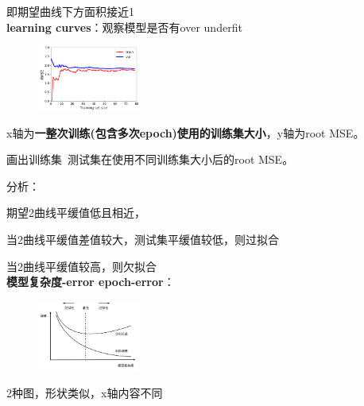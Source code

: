 \documentclass[UTF8]{ctexart}
\begin{document}
  \quad 即期望曲线下方面积接近1\\
\textbf{learning curves}：观察模型是否有over underfit

  \begin{figure}[H] %
    \centering %
    \includegraphics[width=0.3\textwidth]{note_images/learning_curve.png} %
  \end{figure}

  x轴为\textbf{一整次训练(包含多次epoch)使用的训练集大小}，y轴为root MSE。

  画出训练集\ 测试集在使用不同训练集大小后的root MSE。

  分析：

  \quad 期望2曲线平缓值低且相近，

  \quad 当2曲线平缓值差值较大，测试集平缓值较低，则过拟合

  \quad 当2曲线平缓值较高，则欠拟合\\
\textbf{模型复杂度-error epoch-error}：

  \begin{figure}[H] %
    \centering %
    \includegraphics[width=0.3\textwidth]{note_images/epoch-complex-error.png} %
  \end{figure}

  2种图，形状类似，x轴内容不同\\
\end{document}
